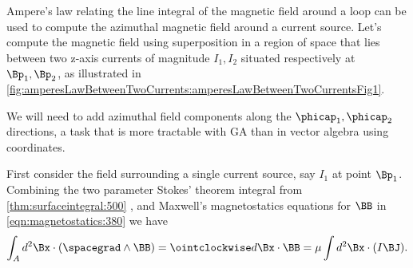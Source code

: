 %
%

Ampere's law relating the line integral of the magnetic field around a loop can be used to compute the azimuthal magnetic field around a current source.
Let's compute the magnetic field using superposition in a region of space that lies between two z-axis currents of magnitude \( I_1, I_2 \) situated respectively at \( \Bp_1, \Bp_2 \), as illustrated in
\cref{fig:amperesLawBetweenTwoCurrents:amperesLawBetweenTwoCurrentsFig1}.


We will need to add azimuthal field components along the \( \phicap_1, \phicap_2 \) directions, a task that is more tractable with GA than in vector algebra using coordinates.

First consider the field surrounding a single current source, say \( I_1 \) at point \( \Bp_1 \).
Combining the two parameter Stokes' theorem integral from 
\cref{thm:surfaceintegral:500}
, and Maxwell's magnetostatics equations for \( \BB \) in \cref{eqn:magnetostatics:380} we have
\begin{dmath}\label{eqn:amperesLawMagnetostaticsExample:20}
\int_A d^2 \Bx \cdot (\spacegrad \wedge \BB) = \ointclockwise d\Bx \cdot \BB = \mu \int d^2 \Bx \cdot (I \BJ).
\end{dmath}

